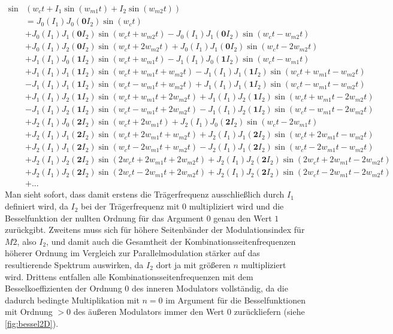 \begin{equation}
\begin{split}
\sin&(w_ct + I_1\sin(w_{m1}t) + I_2\sin(w_{m2}t)) \\
&= J_0(I_1)J_0(\mathbf{0}I_2)\sin(w_ct) \\
&+ J_0(I_1)J_1(\mathbf{0}I_2)\sin(w_ct + w_{m2}t) - J_0(I_1)J_1(\mathbf{0}I_2)\sin(w_ct - w_{m2}t) \\
&+ J_0(I_1)J_2(\mathbf{0}I_2)\sin(w_ct + 2w_{m2}t) + J_0(I_1)J_1(\mathbf{0}I_2)\sin(w_ct - 2w_{m2}t) \\
&+ J_1(I_1)J_0(\mathbf{1}I_2)\sin(w_ct + w_{m1}t) - J_1(I_1)J_0(\mathbf{1}I_2)\sin(w_ct - w_{m1}t) \\
&+ J_1(I_1)J_1(\mathbf{1}I_2)\sin(w_ct + w_{m1}t + w_{m2}t) - J_1(I_1)J_1(\mathbf{1}I_2)\sin(w_ct + w_{m1}t - w_{m2}t) \\
&- J_1(I_1)J_1(\mathbf{1}I_2)\sin(w_ct - w_{m1}t + w_{m2}t) + J_1(I_1)J_1(\mathbf{1}I_2)\sin(w_ct - w_{m1}t - w_{m2}t) \\
&+ J_1(I_1)J_2(\mathbf{1}I_2)\sin(w_ct + w_{m1}t + 2w_{m2}t) + J_1(I_1)J_2(\mathbf{1}I_2)\sin(w_ct + w_{m1}t - 2w_{m2}t) \\
&- J_1(I_1)J_2(\mathbf{1}I_2)\sin(w_ct - w_{m1}t + 2w_{m2}t) - J_1(I_1)J_2(\mathbf{1}I_2)\sin(w_ct - w_{m1}t - 2w_{m2}t) \\
&+ J_2(I_1)J_0(\mathbf{2}I_2)\sin(w_ct + 2w_{m1}t) + J_2(I_1)J_0(\mathbf{2}I_2)\sin(w_ct - 2w_{m1}t) \\
&+ J_2(I_1)J_1(\mathbf{2}I_2)\sin(w_ct + 2w_{m1}t + w_{m2}t) + J_2(I_1)J_1(\mathbf{2}I_2)\sin(w_ct + 2w_{m1}t - w_{m2}t) \\
&+ J_2(I_1)J_1(\mathbf{2}I_2)\sin(w_ct - 2w_{m1}t + w_{m2}t) - J_2(I_1)J_1(\mathbf{2}I_2)\sin(w_ct - 2w_{m1}t - w_{m2}t) \\
&+ J_2(I_1)J_2(\mathbf{2}I_2)\sin(2w_ct + 2w_{m1}t + 2w_{m2}t) + J_2(I_1)J_2(\mathbf{2}I_2)\sin(2w_ct + 2w_{m1}t - 2w_{m2}t) \\
&+ J_2(I_1)J_2(\mathbf{2}I_2)\sin(2w_ct - 2w_{m1}t + 2w_{m2}t) + J_2(I_1)J_2(\mathbf{2}I_2)\sin(2w_ct - 2w_{m1}t - 2w_{m2}t) \\
&+ ... 
\end{split}
\end{equation}
\label{Kaskadenspecials}
Man sieht sofort, dass damit erstens die Trägerfrequenz ausschließlich durch $ I_1 $ definiert wird, da $ I_2 $ bei der Trägerfrequenz mit $0$ multipliziert wird und die Besselfunktion der nullten Ordnung für das Argument $0$ genau den Wert $1$ zurückgibt. Zweitens muss sich für höhere Seitenbänder der Modulationsindex für $M2$, also $ I_2 $, und damit auch die Gesamtheit der Kombinationsseitenfrequenzen höherer Ordnung im Vergleich zur Parallelmodulation stärker auf das resultierende Spektrum auswirken, da $ I_2 $ dort ja mit größeren $n$ multipliziert wird. Drittens entfallen alle Kombinationsseitenfrequenzen mit dem Besselkoeffizienten der Ordnung $0$ des inneren Modulators vollständig, da die dadurch bedingte Multiplikation mit $n = 0$ im Argument für die Besselfunktionen mit Ordnung $>0$ des äußeren Modulators immer den Wert $0$ zurückliefern (siehe \ref{fig:bessel2D}). 


